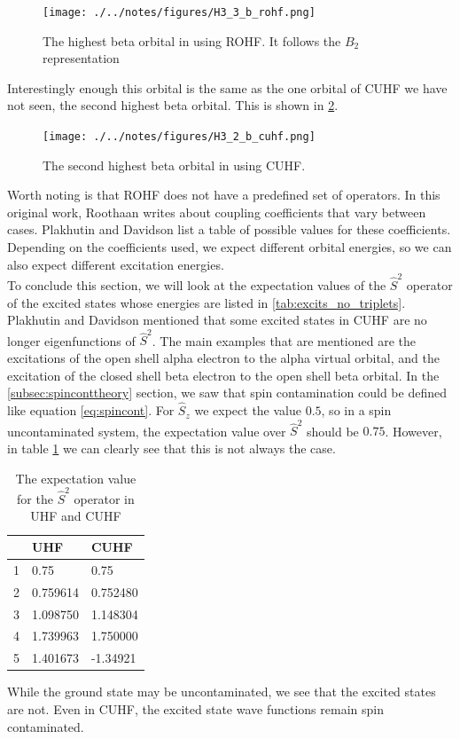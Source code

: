 \documentclass[twoside,twocolumn,9pt]{article}
\begin{document}
\begin{figure}[h]
  \texttt{[image: ./../notes/figures/H3\_3\_b\_rohf.png]}
  \caption{The highest beta orbital in  using ROHF. It follows the $B_2$ representation}
  \label{fig:rohforbitalb2}
\end{figure}

Interestingly enough this orbital is the same as the one orbital of CUHF we have not seen, the second highest beta orbital. This is shown in 
\ref{fig:cuhforbitalb2}.

\begin{figure}
  \texttt{[image: ./../notes/figures/H3\_2\_b\_cuhf.png]}
  \caption{The second highest beta orbital in  using CUHF.}
  \label{fig:cuhforbitalb2}
\end{figure}

Worth noting is that ROHF does not have a predefined set of operators. In this original work, Roothaan writes about coupling coefficients that vary between cases\cite{Roothaan1960}.
Plakhutin and Davidson list a table of possible values for these coefficients\cite{Plakhutin2014}. Depending on the coefficients used, we expect different orbital energies, so we can also
expect different excitation energies. \\

To conclude this section, we will look at the expectation values of the $\hat{S}^2$ operator of the excited states whose energies are listed in \ref{tab:excits_no_triplets}. 
Plakhutin and Davidson mentioned that some excited states in CUHF are no longer eigenfunctions of $\hat{S}^2$\cite{Plakhutin2014}. The main examples that are mentioned are the
excitations of the open shell alpha electron to the alpha virtual orbital, and the excitation of the closed shell beta electron to the open shell beta orbital. In the 
\ref{subsec:spinconttheory} section, we saw that spin contamination could be defined like equation \eqref{eq:spincont}. For $\hat{S}_z$ we expect the value $0.5$\cite{Acke2019}, so in a 
spin uncontaminated system, the expectation value over $\hat{S}^2$ should be $0.75$. However, in table \ref{tab:spincon} we can clearly see that this is not always the case.

\begin{table}[h]
  \caption{The expectation value for the $\hat{S}^2$ operator in UHF and CUHF}
  \label{tab:spincon}
  \begin{tabular}{l|l|l}
    & UHF       & CUHF      \\
  \hline
  1 & 0.75 & 0.75 \\
  2 & 0.759614 & 0.752480 \\
  3 & 1.098750 & 1.148304 \\
  4 & 1.739963 & 1.750000 \\
  5 & 1.401673 & -1.34921
\end{tabular}
\end{table}
While the ground state may be uncontaminated, we see that the excited states are not. Even in CUHF, the excited state wave functions remain spin contaminated.
\end{document}
